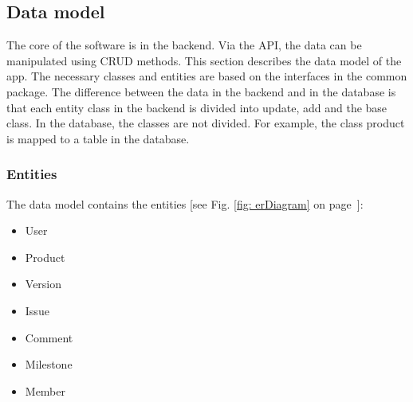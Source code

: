     

    \subsection*{Data model}
    The core of the software is in the backend. Via the API, the data can be manipulated using CRUD methods. This section describes the data model of the app. The necessary classes and entities are based on the interfaces in the common package. The difference between the data in the backend and in the database is that each entity class in the backend is divided into update, add and the base class. In the database, the classes are not divided. For example, the class product is mapped to a table in the database.
    
    \subsubsection*{Entities}
    The data model contains the entities [see Fig. \ref{fig: erDiagram} on page~\pageref{fig: erDiagram}]:
    \begin{itemize}
        \item User
        \item Product
        \item Version
        \item Issue
        \item Comment
        \item Milestone
        \item Member
    \end{itemize}

